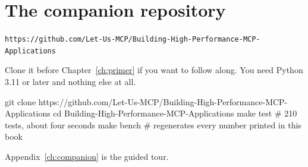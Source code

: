 \section*{The companion repository}

\begin{center}
\texttt{https://github.com/Let-Us-MCP/Building-High-Performance-MCP-Applications}
\end{center}

\noindent Clone it before Chapter~\ref{ch:primer} if you want to follow along.
You need Python 3.11 or later and nothing else at all.

\begin{sh}
git clone https://github.com/Let-Us-MCP/Building-High-Performance-MCP-Applications
cd Building-High-Performance-MCP-Applications
make test     # 210 tests, about four seconds
make bench    # regenerates every number printed in this book
\end{sh}

\noindent Appendix~\ref{ch:companion} is the guided tour.

\cleardoublepage
